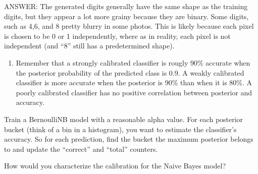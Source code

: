 \documentclass[11pt]{article}
\providecommand{\tightlist}{%
      \setlength{\itemsep}{0pt}\setlength{\parskip}{0pt}}
\begin{document}
    ANSWER: The generated digits generally have the same shape as the
training digits, but they appear a lot more grainy because they are
binary. Some digits, such as 4,6, and 8 pretty blurry in some photos.
This is likely because each pixel is chosen to be 0 or 1 independently,
where as in reality, each pixel is not independent (and ``8'' still has
a predetermined shape).

    \begin{enumerate}
\def\labelenumi{(\arabic{enumi})}
\setcounter{enumi}{10}
\tightlist
\item
  Remember that a strongly calibrated classifier is rougly 90\% accurate
  when the posterior probability of the predicted class is 0.9. A weakly
  calibrated classifier is more accurate when the posterior is 90\% than
  when it is 80\%. A poorly calibrated classifier has no positive
  correlation between posterior and accuracy.
\end{enumerate}

Train a BernoulliNB model with a reasonable alpha value. For each
posterior bucket (think of a bin in a histogram), you want to estimate
the classifier's accuracy. So for each prediction, find the bucket the
maximum posterior belongs to and update the ``correct'' and ``total''
counters.

How would you characterize the calibration for the Naive Bayes model?
\end{document}

